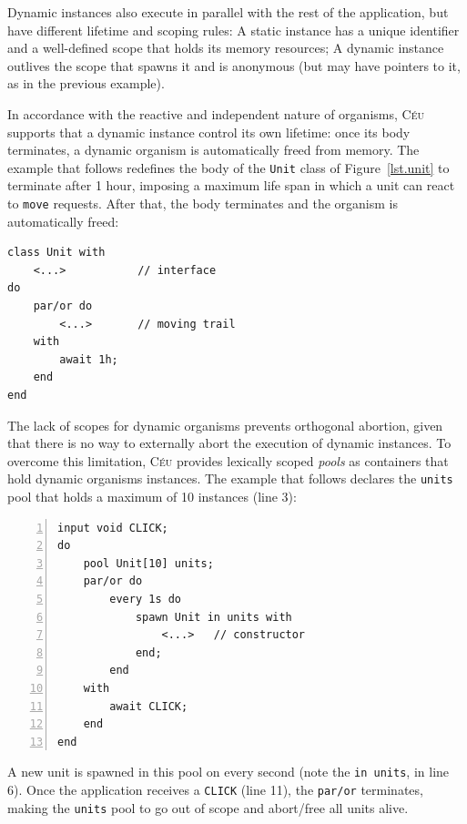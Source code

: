 \documentclass{acm_proc_article-sp}
\newcommand{\CEU}{\textsc{C\'{e}u}\xspace}
\newcommand{\code}[1] {{\small{\texttt{#1}}}}
\newcommand{\1}{\;}
\newcommand{\2}{\;\;}
\newcommand{\3}{\;\;\;}
\newcommand{\5}{\;\;\;\;\;}
\begin{document}
Dynamic instances also execute in parallel with the rest of the application, 
but have different lifetime and scoping rules:
%
A static instance has a unique identifier and a well-defined scope that holds 
its memory resources;
A dynamic instance outlives the scope that spawns it and is anonymous (but may 
have pointers to it, as in the previous example).

In accordance with the reactive and independent nature of organisms, \CEU 
supports that a dynamic instance control its own lifetime:
once its body terminates, a dynamic organism is automatically freed from 
memory.
%
The example that follows redefines the body of the \code{Unit} class of 
Figure~\ref{lst.unit} to terminate after 1 hour, imposing a maximum life span 
in which a unit can react to \code{move} requests.
After that, the body terminates and the organism is automatically freed:

\begin{lstlisting}
class Unit with
    <...>           // interface
do
    par/or do
        <...>       // moving trail
    with
        await 1h;
    end
end
\end{lstlisting}

The lack of scopes for dynamic organisms prevents orthogonal abortion, given 
that there is no way to externally abort the execution of dynamic instances.
%
To overcome this limitation, \CEU provides lexically scoped \emph{pools} as 
containers that hold dynamic organisms instances.
%
The example that follows declares the \code{units} pool that holds a maximum of 
10 instances (line 3):

\begin{lstlisting}[numbers=left,xleftmargin=3em]
input void CLICK;
do
    pool Unit[10] units;
    par/or do
        every 1s do
            spawn Unit in units with
                <...>   // constructor
            end;
        end
    with
        await CLICK;
    end
end
\end{lstlisting}

A new unit is spawned in this pool on every second (note the \code{in units}, 
in line 6).
Once the application receives a \code{CLICK} (line 11), the \code{par/or} 
terminates, making the \code{units} pool to go out of scope and abort/free all 
units alive.
\end{document}
